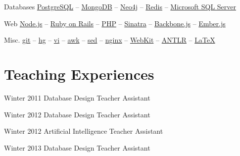 \documentclass{tccv}
\begin{document}
{{\begin{factlist}
\item{Databases}
     {
     \href{http://www.postgresql.org}{PostgreSQL} -- 
     \href{http://www.mongodb.org}{MongoDB} -- 
     \href{http://www.neo4j.org}{Neo4j} -- 
     \href{http://redis.io}{Redis} -- 
     \href{http://www.microsoft.com/en-us/sqlserver/default.aspx}{Microsoft SQL Server}
     }

\item{Web}
     {
     \href{http://nodejs.org}{Node.js} -- 
     \href{http://rubyonrails.org}{Ruby on Rails} -- 
     \href{http://php.net}{PHP} -- 
     \href{http://www.sinatrarb.com}{Sinatra} -- 
     \href{http://backbonejs.org}{Backbone.js} -- 
     \href{http://emberjs.com}{Ember.js}
     }

\item{Misc.}
     {
     \href{http://git-scm.com}{git} -- 
     \href{http://www.selenic.com/mercurial/}{hg} -- 
     \href{http://www.vim.org}{vi} -- 
     \href{http://awk.info}{awk} -- 
     \href{http://www.gnu.org/software/sed/}{sed} -- 
     \href{http://nginx.org/en/}{nginx} -- 
     \href{http://www.webkit.org}{WebKit} -- 
     \href{http://www.antlr.org}{ANTLR} -- 
     \href{http://www.latex-project.org}{\LaTeX}
     }

\end{factlist}




\vspace{8pt}





\section{Teaching Experiences}

\begin{teaching}


\item{Winter 2011}
	 {}
	 {Database Design}
	 {Teacher Assistant}


\item{Winter 2012}
	 {}
	 {Database Design}
	 {Teacher Assistant}


\item{Winter 2012}
	 {}
	 {Artificial Intelligence}
	 {Teacher Assistant}


\item{Winter 2013}
	 {}
	 {Database Design}
	 {Teacher Assistant}




\end{teaching}}}
\end{document}
